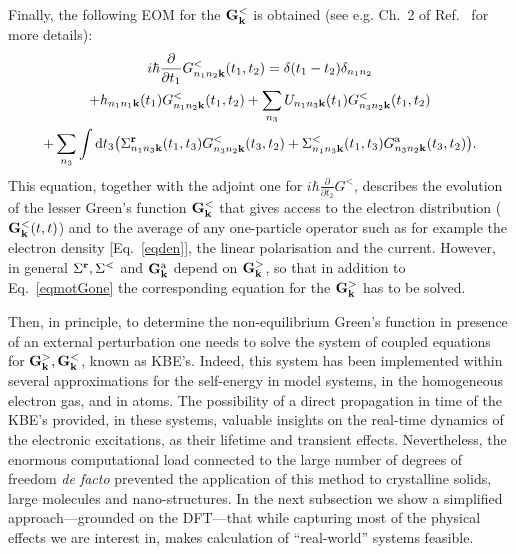Finally, 
the following EOM for the ${\bf G}_{{\bf k}}^<$ is obtained (see e.g. Ch.~2 of
Ref.~\cite{kremp} for more details):
\begin{multline}
 i\hbar  \frac{\partial}{\partial t_1} G^<_{n_1n_2{\bf k}}(t_1,t_2)=\mbox{}  \delta(t_1-t_2)\delta_{n_1n_2}    \\
+  h_{n_1n_1{\bf k}}(t_1) G^<_{n_1n_2{\bf k}}(t_1,t_2) + \sum_{n_3}U_{n_1n_3{\bf k}}(t_1) G^<_{n_3n_2{\bf k}}(t_1,t_2) \\
+  \sum_{n_3} \int \mathrm{d}t_3 \big( \Sigma^{{\bf r}}_{n_1n_3{\bf k}}(t_1,t_3)G^<_{n_3n_2{\bf k} }(t_3,t_2) 
+ \Sigma^<_{n_1n_3{\bf k}}(t_1,t_3) G^{\mathrm a}_{n_3n_2{\bf k}}(t_3,t_2)\big) .
\label{eqmotGone}
\end{multline}
This equation, together with the adjoint one for $ i\hbar  \frac{\partial}{\partial t_2} G^<$, describes the
evolution of the lesser Green's function ${\bf G}_{{\bf k}}^<$ that gives
access to the electron distribution (${\bf G}_{{\bf k}}^<(t,t)$) and to the
average of any one-particle operator such as for example the electron
density [Eq.~\eqref{eqden}], the linear polarisation and the current.  However, in general $\Sigma^{{\bf r}},\Sigma^<$ and  ${\bf G}_{{\bf k}}^{\mathrm a}$ depend on ${\bf G}_{{\bf k}}^>$, so that in addition to Eq.~\eqref{eqmotGone} the corresponding equation for the ${\bf G}_{{\bf k}}^>$ has to be solved. 

Then, in principle, to determine the non-equilibrium Green's function in presence of an external perturbation one needs  to solve the system of coupled equations for ${\bf G}_{{\bf k}}^>,{\bf G}_{{\bf k}}^<$, known as KBE's. Indeed, this system has been implemented within several approximations for the self-energy in model
systems\cite{Kohler1999123,PhysRevLett.103.176404}, in the homogeneous electron gas\cite{PhysRevLett.84.1768}, and in atoms\cite{PhysRevLett.98.153004}.
The possibility of a direct propagation in time of the KBE's provided, in these systems, valuable insights on the real-time dynamics of the electronic excitations, as their lifetime and transient effects.\cite{Kohler1999123,PhysRevLett.103.176404,PhysRevLett.84.1768,PhysRevLett.98.153004} 
Nevertheless, the enormous computational load connected to the large number of degrees of freedom {\it de facto} prevented the application of this method to crystalline solids, large molecules and nano-structures. In the next subsection we show a simplified approach---grounded on the DFT---that while capturing most of the physical effects we are interest in, makes calculation of ``real-world'' systems feasible. 

